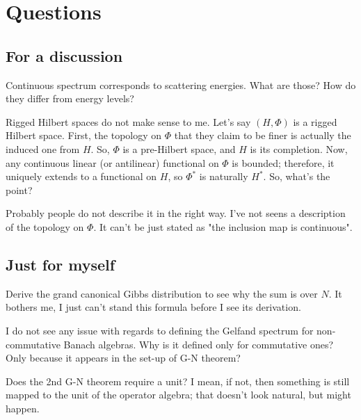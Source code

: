 \section{Questions}
\subsection{For a discussion}

\begin{quest}
Continuous spectrum corresponds to scattering energies. What are those? How do they differ from energy levels?
\end{quest}
%

\begin{quest}
Rigged Hilbert spaces do not make sense to me. Let's say $(H,\Phi)$ is a rigged Hilbert space. First, the topology on $\Phi$ that they claim to be finer is actually the induced one from $H$. So, $\Phi$ is a pre-Hilbert space, and $H$ is its completion. Now, any continuous linear (or antilinear) functional on $\Phi$ is bounded; therefore, it uniquely extends to a functional on $H$, so $\Phi^*$ is naturally $H^*$. So, what's the point? 

Probably people do not describe it in the right way. I've not seens a description of the topology on $\Phi$. It can't be just stated as "the inclusion map is continuous".
\end{quest}


\subsection{Just for myself}
\begin{quest}
Derive the grand canonical Gibbs distribution to see why the sum is over $N$. It bothers me, I just can't stand this formula before I see its derivation.
\end{quest}
\begin{quest}
I do not see any issue with regards to defining the Gelfand spectrum for non-commutative Banach algebras. Why is it defined only for commutative ones? Only because it appears in the set-up of G-N theorem?
\end{quest}
\begin{quest}
Does the 2nd G-N theorem require a unit? I mean, if not, then something is still mapped to the unit of the operator algebra; that doesn't look natural, but might happen.
\end{quest}

